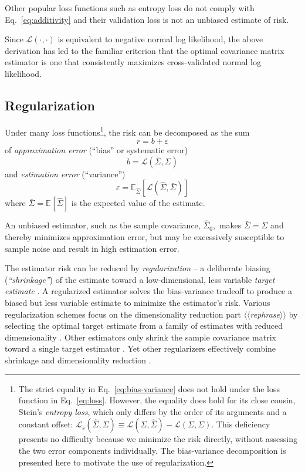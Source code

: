 \documentclass[10pt]{article}
\newcommand{\loss}[1]{\mathcal L\left(#1\right)}
\newcommand{\E}[2][]{\mathbb E_{#1}\left[ #2\right]}    %
\newcommand{\TODO}[1]{\emph{\small\color{blue}$\langle\langle$#1$\rangle\rangle$}}
\begin{document}
Other popular loss functions such as entropy loss do not comply with Eq.~\ref{eq:additivity} and their validation loss is not an unbiased estimate of risk.

Since $\loss{\cdot,\cdot}$ is equivalent to negative normal log likelihood, the above derivation has led to the familiar criterion that the optimal covariance matrix estimator is one that consistently maximizes cross-validated normal log likelihood.

 
\subsection*{Regularization}
Under many loss functions\footnote{
The strict equality in Eq.~\ref{eq:bias-variance} does not hold under the loss function in Eq.~\ref{eq:loss}. 
However, the equality does hold for its close cousin, Stein's \emph{entropy loss}, which only differs by the order of its arguments and a constant offset: $\mathcal L_s(\hat\Sigma,\Sigma) \equiv \loss{\Sigma,\hat\Sigma} - \loss{\Sigma,\Sigma}$. 
This deficiency presents no difficulty because we minimize the risk directly, without assessing the two error components individually. 
The bias-variance decomposition is presented here to motivate the use of regularization.}, 
the risk can be decomposed as the sum
\begin{equation}\label{eq:bias-variance}
    r = b + \varepsilon
\end{equation}
of \emph{approximation error} (``bias'' or systematic error)
\begin{equation}
   b = \loss{\bar\Sigma,\Sigma}
\end{equation}
and \emph{estimation error} (``variance'') 
\begin{equation}
   \varepsilon = \E[\hat\Sigma]{\loss{\hat\Sigma, \bar\Sigma}}
\end{equation}
where $\bar\Sigma = \E{\hat\Sigma}$ is the expected value of the estimate. 

An unbiased estimator, such as the sample covariance,  $\hat\Sigma_0,$ makes $\bar\Sigma=\Sigma$ and thereby minimizes approximation error, but may be excessively susceptible to sample noise and result in high estimation error.

The estimator risk can be reduced by \emph{regularization} -- a deliberate biasing (\emph{``shrinkage''}) of the estimate toward a low-dimensional, less variable \emph{target estimate} \cite{Bickel:2006,Ledoit:2004}. 
A regularized estimator solves the bias-variance tradeoff to produce a biased but less variable estimate to minimize the estimator's risk.  
Various regularization schemes focus on the dimensionality reduction part \TODO{rephrase} by selecting the optimal target estimate from a family of estimates with reduced dimensionality \cite{findit}.  
Other estimators only shrink the sample covariance matrix toward a single target estimator \cite{Schafer:2005}. 
Yet other regularizers effectively combine shrinkage and dimensionality reduction \cite{findit}.
\end{document}
